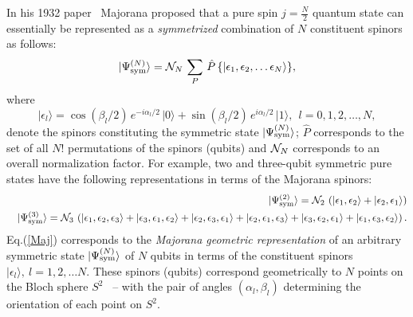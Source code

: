 \documentclass[pra,preprint,a4paper,superscriptaddress]{revtex4}
\begin{document}
{In his 1932 paper~\cite{majorana} %
Majorana proposed that a pure spin $j=\frac{N}{2}$ quantum state can essentially be represented as a {\em symmetrized} combination of $N$ constituent spinors as follows:  
\begin{equation}
\label{Maj}
\vert \Psi^{(N)}_{\rm sym}\rangle={\cal N}_N\, \sum_{P}\, \hat{P}\, \{\vert \epsilon_1, \epsilon_2, 
\ldots  \epsilon_N \rangle\}, 
\end{equation} 
where 
\begin{equation}
\label{spinor}
\vert\epsilon_l\rangle= 
\cos(\beta_l/2)\, e^{-i\alpha_l/2}\, \vert 0\rangle +
\sin(\beta_l/2)\, e^{i\alpha_l/2} \, \vert 1\rangle,\ \ l=0,1,2,\ldots, N,
\end{equation}
denote the spinors constituting the symmetric state $\vert \Psi^{(N)}_{\rm sym}\rangle$;
 $\hat{P}$ corresponds to the set of all $N!$ 
permutations of the spinors (qubits) and ${\cal N}_N$ corresponds to an overall normalization factor. For example, two and three-qubit symmetric pure states have the following representations in terms of 
the Majorana spinors:
\begin{eqnarray*}
&&\vert \Psi^{(2)}_{\rm sym}\rangle={\cal N}_2\,  \left(\vert \epsilon_1, 
 \epsilon_2\rangle+  \vert \epsilon_2,\epsilon_1\rangle\right)\\
&&\vert \Psi^{(3)}_{\rm sym}\rangle={\cal N}_3\,\left(  \vert \epsilon_1,
 \epsilon_2, \epsilon_3\rangle+  \vert \epsilon_3,\epsilon_1, \epsilon_2\rangle  + \vert \epsilon_2, 
 \epsilon_3, \epsilon_1\rangle +\vert \epsilon_2,\epsilon_1,\epsilon_3\rangle+
 \vert \epsilon_3,\epsilon_2,\epsilon_1\rangle+ 
 \vert \epsilon_1, \epsilon_3, \epsilon_2\rangle \right).
\end{eqnarray*}
Eq.(\ref{Maj}) corresponds to the {\em Majorana geometric representation} of an arbitrary symmetric state 
$\vert \Psi^{(N)}_{\rm sym}\rangle$ of $N$ qubits in terms of the constituent spinors $\vert \epsilon_l \rangle,\  l=1,2,\ldots N$. These spinors (qubits) correspond geometrically to $N$ points on the  Bloch sphere $S^2$~\cite{makela,jpa4,markham1,markham2,gebastin, markham3} -- with the pair of angles $(\alpha_l,\beta_l)$ determining the orientation of each point on $S^2$.

}
\end{document}
